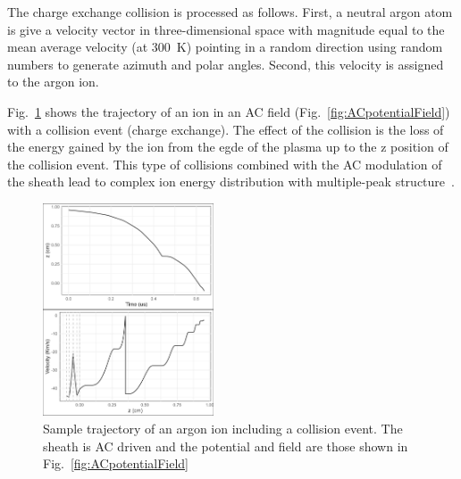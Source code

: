 The charge exchange collision is processed as follows. First, a neutral argon atom is give a velocity vector in three-dimensional space  with magnitude equal to the mean average velocity (at 300~K) pointing in a random direction using random numbers to generate azimuth and polar angles. Second, this velocity is assigned to the argon ion.    

Fig.~\ref{fig:CollisionACtrajectory} shows the trajectory of an ion in an AC field (Fig.~\ref{fig:ACpotentialField}) with a collision event (charge exchange). The effect of the collision is the loss of the energy gained by the ion from the egde of the plasma up to the z position of the collision event. This type of collisions combined with the AC modulation of the sheath lead to complex ion energy distribution with multiple-peak structure~\cite{Wild1991}.

\begin{figure}[htbp]
\centering
\includegraphics[width=0.45\textwidth]{Figures/ionTrajectory0.5Pa13.56MHz2kVStack2332.jpeg}
\caption{Sample trajectory of an argon ion including a collision event. The sheath is AC driven and the potential and field are those shown in Fig.~\ref{fig:ACpotentialField} }
\label{fig:CollisionACtrajectory}
\end{figure}
